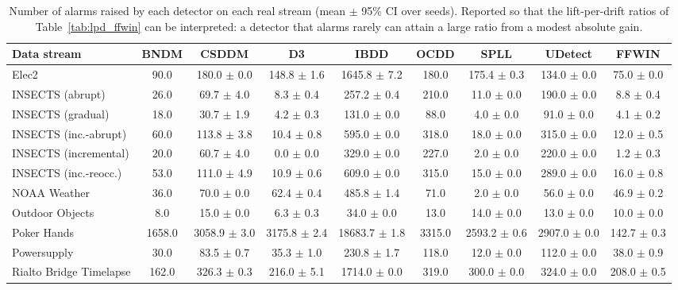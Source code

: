 \begin{table}[!t]
\centering
\caption{Number of alarms raised by each detector on each real stream (mean $\pm$ 95\% CI over seeds). Reported so that the lift-per-drift ratios of Table~\ref{tab:lpd_ffwin} can be interpreted: a detector that alarms rarely can attain a large ratio from a modest absolute gain.}
\label{tab:alarm_counts}
\footnotesize
\setlength{\tabcolsep}{4pt}
\begin{tabular}{@{}lcccccccc@{}}
\toprule
\textbf{Data stream} & \textbf{BNDM} & \textbf{CSDDM} & \textbf{D3} & \textbf{IBDD} & \textbf{OCDD} & \textbf{SPLL} & \textbf{UDetect} & \textbf{FFWIN} \\
\midrule
Elec2 & 90.0 & 180.0 $\pm$ 0.0 & 148.8 $\pm$ 1.6 & 1645.8 $\pm$ 7.2 & 180.0 & 175.4 $\pm$ 0.3 & 134.0 $\pm$ 0.0 & 75.0 $\pm$ 0.0 \\
INSECTS (abrupt) & 26.0 & 69.7 $\pm$ 4.0 & 8.3 $\pm$ 0.4 & 257.2 $\pm$ 0.4 & 210.0 & 11.0 $\pm$ 0.0 & 190.0 $\pm$ 0.0 & 8.8 $\pm$ 0.4 \\
INSECTS (gradual) & 18.0 & 30.7 $\pm$ 1.9 & 4.2 $\pm$ 0.3 & 131.0 $\pm$ 0.0 & 88.0 & 4.0 $\pm$ 0.0 & 91.0 $\pm$ 0.0 & 4.1 $\pm$ 0.2 \\
INSECTS (inc.-abrupt) & 60.0 & 113.8 $\pm$ 3.8 & 10.4 $\pm$ 0.8 & 595.0 $\pm$ 0.0 & 318.0 & 18.0 $\pm$ 0.0 & 315.0 $\pm$ 0.0 & 12.0 $\pm$ 0.5 \\
INSECTS (incremental) & 20.0 & 60.7 $\pm$ 4.0 & 0.0 $\pm$ 0.0 & 329.0 $\pm$ 0.0 & 227.0 & 2.0 $\pm$ 0.0 & 220.0 $\pm$ 0.0 & 1.2 $\pm$ 0.3 \\
INSECTS (inc.-reocc.) & 53.0 & 111.0 $\pm$ 4.9 & 10.9 $\pm$ 0.6 & 609.0 $\pm$ 0.0 & 315.0 & 15.0 $\pm$ 0.0 & 289.0 $\pm$ 0.0 & 16.0 $\pm$ 0.8 \\
NOAA Weather & 36.0 & 70.0 $\pm$ 0.0 & 62.4 $\pm$ 0.4 & 485.8 $\pm$ 1.4 & 71.0 & 2.0 $\pm$ 0.0 & 56.0 $\pm$ 0.0 & 46.9 $\pm$ 0.2 \\
Outdoor Objects & 8.0 & 15.0 $\pm$ 0.0 & 6.3 $\pm$ 0.3 & 34.0 $\pm$ 0.0 & 13.0 & 14.0 $\pm$ 0.0 & 13.0 $\pm$ 0.0 & 10.0 $\pm$ 0.0 \\
Poker Hands & 1658.0 & 3058.9 $\pm$ 3.0 & 3175.8 $\pm$ 2.4 & 18683.7 $\pm$ 1.8 & 3315.0 & 2593.2 $\pm$ 0.6 & 2907.0 $\pm$ 0.0 & 142.7 $\pm$ 0.3 \\
Powersupply & 30.0 & 83.5 $\pm$ 0.7 & 35.3 $\pm$ 1.0 & 230.8 $\pm$ 1.7 & 118.0 & 12.0 $\pm$ 0.0 & 112.0 $\pm$ 0.0 & 38.0 $\pm$ 0.9 \\
Rialto Bridge Timelapse & 162.0 & 326.3 $\pm$ 0.3 & 216.0 $\pm$ 5.1 & 1714.0 $\pm$ 0.0 & 319.0 & 300.0 $\pm$ 0.0 & 324.0 $\pm$ 0.0 & 208.0 $\pm$ 0.5 \\
\bottomrule
\end{tabular}
\end{table}
